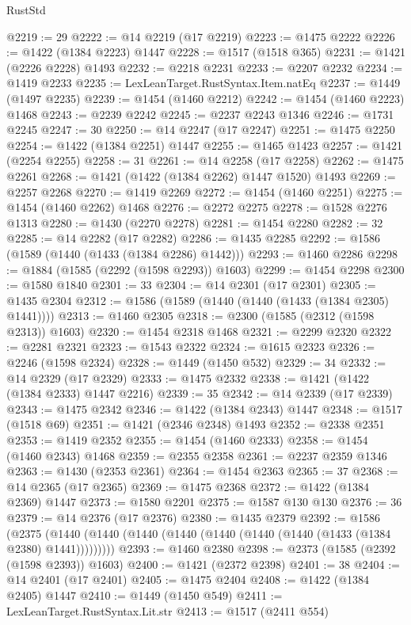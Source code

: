 \begin{lexlean}{RustStd}
\begin{coremodule}
@2219 := 29
@2222 := @14 @2219 (@17 @2219)
@2223 := @1475 @2222
@2226 := @1422 (@1384 @2223) @1447
@2228 := @1517 (@1518 @365)
@2231 := @1421 (@2226 @2228) @1493
@2232 := @2218 @2231
@2233 := @2207 @2232
@2234 := @1419 @2233
@2235 := LexLeanTarget.RustSyntax.Item.natEq
@2237 := @1449 (@1497 @2235)
@2239 := @1454 (@1460 @2212)
@2242 := @1454 (@1460 @2223) @1468
@2243 := @2239 @2242
@2245 := @2237 @2243 @1346
@2246 := @1731 @2245
@2247 := 30
@2250 := @14 @2247 (@17 @2247)
@2251 := @1475 @2250
@2254 := @1422 (@1384 @2251) @1447
@2255 := @1465 @1423
@2257 := @1421 (@2254 @2255)
@2258 := 31
@2261 := @14 @2258 (@17 @2258)
@2262 := @1475 @2261
@2268 := @1421 (@1422 (@1384 @2262) @1447 @1520) @1493
@2269 := @2257 @2268
@2270 := @1419 @2269
@2272 := @1454 (@1460 @2251)
@2275 := @1454 (@1460 @2262) @1468
@2276 := @2272 @2275
@2278 := @1528 @2276 @1313
@2280 := @1430 (@2270 @2278)
@2281 := @1454 @2280
@2282 := 32
@2285 := @14 @2282 (@17 @2282)
@2286 := @1435 @2285
@2292 := @1586 (@1589 (@1440 (@1433 (@1384 @2286) @1442)))
@2293 := @1460 @2286
@2298 := @1884 (@1585 (@2292 (@1598 @2293)) @1603)
@2299 := @1454 @2298
@2300 := @1580 @1840
@2301 := 33
@2304 := @14 @2301 (@17 @2301)
@2305 := @1435 @2304
@2312 := @1586 (@1589 (@1440 (@1440 (@1433 (@1384 @2305) @1441))))
@2313 := @1460 @2305
@2318 := @2300 (@1585 (@2312 (@1598 @2313)) @1603)
@2320 := @1454 @2318 @1468
@2321 := @2299 @2320
@2322 := @2281 @2321
@2323 := @1543 @2322
@2324 := @1615 @2323
@2326 := @2246 (@1598 @2324)
@2328 := @1449 (@1450 @532)
@2329 := 34
@2332 := @14 @2329 (@17 @2329)
@2333 := @1475 @2332
@2338 := @1421 (@1422 (@1384 @2333) @1447 @2216)
@2339 := 35
@2342 := @14 @2339 (@17 @2339)
@2343 := @1475 @2342
@2346 := @1422 (@1384 @2343) @1447
@2348 := @1517 (@1518 @69)
@2351 := @1421 (@2346 @2348) @1493
@2352 := @2338 @2351
@2353 := @1419 @2352
@2355 := @1454 (@1460 @2333)
@2358 := @1454 (@1460 @2343) @1468
@2359 := @2355 @2358
@2361 := @2237 @2359 @1346
@2363 := @1430 (@2353 @2361)
@2364 := @1454 @2363
@2365 := 37
@2368 := @14 @2365 (@17 @2365)
@2369 := @1475 @2368
@2372 := @1422 (@1384 @2369) @1447
@2373 := @1580 @2201
@2375 := @1587 @130 @130
@2376 := 36
@2379 := @14 @2376 (@17 @2376)
@2380 := @1435 @2379
@2392 := @1586
    (@2375 (@1440 (@1440 (@1440 (@1440 (@1440 (@1440 (@1440 (@1433 (@1384 @2380) @1441)))))))))
@2393 := @1460 @2380
@2398 := @2373 (@1585 (@2392 (@1598 @2393)) @1603)
@2400 := @1421 (@2372 @2398)
@2401 := 38
@2404 := @14 @2401 (@17 @2401)
@2405 := @1475 @2404
@2408 := @1422 (@1384 @2405) @1447
@2410 := @1449 (@1450 @549)
@2411 := LexLeanTarget.RustSyntax.Lit.str
@2413 := @1517 (@2411 @554)

\end{coremodule}
\end{lexlean}

